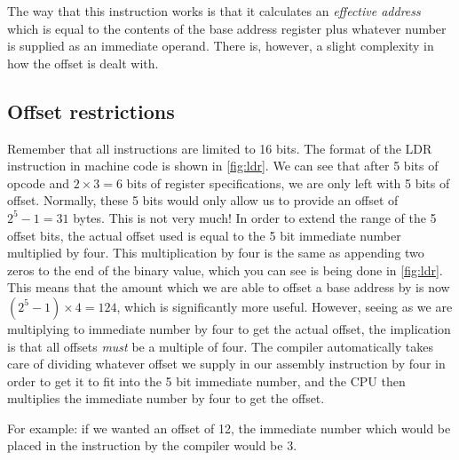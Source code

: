 The way that this instruction works is that it calculates an \emph{effective address} which is equal to the contents of the base address register plus whatever number is supplied as an immediate operand.
There is, however, a slight complexity in how the offset is dealt with.

\subsection{Offset restrictions}
\label{sec:load-store-restrictions}
Remember that all instructions are limited to 16 bits. The format of the LDR instruction in machine code is shown in \autoref{fig:ldr}. We can see that after 5 bits of opcode and $2 \times 3 = 6$ bits of register specifications, we are only left with 5 bits of offset. Normally, these 5 bits would only allow us to provide an offset of $2^5 - 1 = 31$ bytes. This is not very much! In order to extend the range of the 5 offset bits, the actual offset used is equal to the 5 bit immediate number multiplied by four. This multiplication by four is the same as appending two zeros to the end of the binary value, which you can see is being done in \autoref{fig:ldr}. This means that the amount which we are able to offset a base address by is now $(2^5 - 1) \times 4 = 124$, which is significantly more useful. However, seeing as we are multiplying to immediate number by four to get the actual offset, the implication is that all offsets \emph{must} be a multiple of four. 
The compiler automatically takes care of dividing whatever offset we supply in our assembly instruction by four in order to get it to fit into the 5 bit immediate number, and the CPU then multiplies the immediate number by four to get the offset.

For example: if we wanted an offset of 12, the immediate number which would be placed in the instruction by the compiler would be 3.

